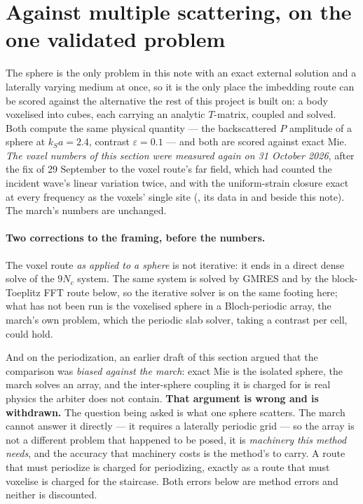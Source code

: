 \documentclass[11pt,a4paper]{article}
\begin{document}
\section{Against multiple scattering, on the one validated
problem}\label{sec:vsfoldy}

The sphere is the only problem in this note with an exact external solution and
a laterally varying medium at once, so it is the only place the imbedding route
can be scored against the alternative the rest of this project is built on: a
body voxelised into cubes, each carrying an analytic $T$-matrix, coupled and
solved.  Both compute the same physical quantity --- the backscattered $P$
amplitude of a sphere at $k_Sa=2.4$, contrast $\varepsilon=0.1$ --- and both are
scored against exact Mie.  \emph{The voxel numbers of this section were measured again on 31 October
2026}, after the fix of 29 September to the voxel route's far field, which had counted the incident
wave's linear variation twice, and with the uniform-strain closure exact at every frequency as the
voxels' single site (, its data in
 and  beside this note).  The march's
numbers are unchanged.

\paragraph{Two corrections to the framing, before the numbers.}  The voxel route
\emph{as applied to a sphere} is not iterative: it ends in a direct dense solve
of the $9N_c$ system.  The same system is solved by GMRES and by the
block-Toeplitz FFT route below, so the iterative solver is on the same footing
here; what has not been run is the voxelised sphere in a Bloch-periodic array,
the march's own problem, which the periodic slab solver, taking a contrast per
cell, could hold.

And on the periodization, an earlier draft of this section argued that the
comparison was \emph{biased against the march}: exact Mie is the isolated
sphere, the march solves an array, and the inter-sphere coupling it is charged
for is real physics the arbiter does not contain.  \textbf{That argument is
wrong and is withdrawn.}  The question being asked is what one sphere
scatters.  The march cannot answer it directly --- it requires a laterally
periodic grid --- so the array is not a different problem that happened to be
posed, it is \emph{machinery this method needs}, and the accuracy that
machinery costs is the method's to carry.  A route that must periodize is
charged for periodizing, exactly as a route that must voxelise is charged for
the staircase.  Both errors below are method errors and neither is discounted.
\end{document}
